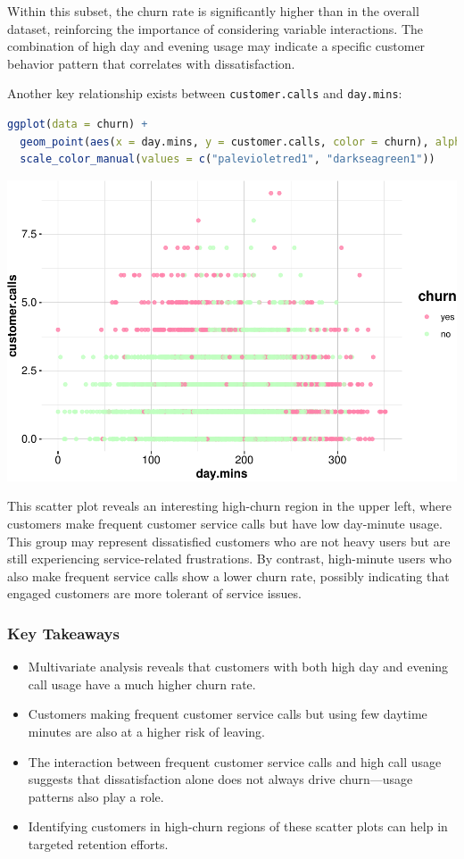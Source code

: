 \documentclass[
]{book}
\newcommand{\passthrough}[1]{#1}
\providecommand{\tightlist}{%
  \setlength{\itemsep}{0pt}\setlength{\parskip}{0pt}}
\theoremstyle{definition}
\theoremstyle{definition}
\theoremstyle{definition}
\theoremstyle{definition}
\theoremstyle{remark}
\begin{document}
Within this subset, the churn rate is significantly higher than in the overall dataset, reinforcing the importance of considering variable interactions. The combination of high day and evening usage may indicate a specific customer behavior pattern that correlates with dissatisfaction.

Another key relationship exists between \passthrough{\lstinline!customer.calls!} and \passthrough{\lstinline!day.mins!}:

\begin{lstlisting}[language=R]
ggplot(data = churn) +
  geom_point(aes(x = day.mins, y = customer.calls, color = churn), alpha = 0.8) +
  scale_color_manual(values = c("palevioletred1", "darkseagreen1"))
\end{lstlisting}

\begin{center}\includegraphics[width=0.7\linewidth]{EDA_files/figure-latex/unnamed-chunk-17-1} \end{center}

This scatter plot reveals an interesting high-churn region in the upper left, where customers make frequent customer service calls but have low day-minute usage. This group may represent dissatisfied customers who are not heavy users but are still experiencing service-related frustrations. By contrast, high-minute users who also make frequent service calls show a lower churn rate, possibly indicating that engaged customers are more tolerant of service issues.

\subsubsection*{Key Takeaways}\label{key-takeaways}

\begin{itemize}
\tightlist
\item
  Multivariate analysis reveals that customers with both high day and evening call usage have a much higher churn rate.
\item
  Customers making frequent customer service calls but using few daytime minutes are also at a higher risk of leaving.
\item
  The interaction between frequent customer service calls and high call usage suggests that dissatisfaction alone does not always drive churn---usage patterns also play a role.
\item
  Identifying customers in high-churn regions of these scatter plots can help in targeted retention efforts.
\end{itemize}
\end{document}
